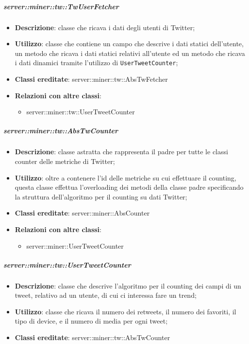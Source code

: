 	\subparagraph{server::miner::tw::TwUserFetcher} %
		\label{subp:server_miner_tw_TwUserFetcher}
			\begin{itemize}
				\item \textbf{Descrizione}: classe che ricava i dati degli utenti di Twitter;
				\item \textbf{Utilizzo}: classe che contiene un campo che descrive i dati statici dell'utente, un metodo che ricava i dati statici relativi all'utente ed un metodo che ricava i dati dinamici tramite l'utilizzo di \texttt{UserTweetCounter};
				\item \textbf{Classi ereditate}: server::miner::tw::AbsTwFetcher
				\item \textbf{Relazioni con altre classi}:
					\begin{itemize}
						\item server::miner::tw::UserTweetCounter
					\end{itemize}
			\end{itemize}

	\subparagraph{server::miner::tw::AbsTwCounter} %
		\label{subp:server_miner_tw_AbsTwCounter}
			\begin{itemize}
				\item \textbf{Descrizione}: classe astratta che rappresenta il padre per tutte le classi counter delle metriche di Twitter;
				\item \textbf{Utilizzo}: oltre a contenere l’id delle metriche su cui effettuare il counting, questa classe effettua l'overloading dei metodi della classe padre specificando la struttura dell'algoritmo per il counting su dati Twitter;
				\item \textbf{Classi ereditate}: server::miner::AbsCounter
				\item \textbf{Relazioni con altre classi}:
					\begin{itemize}
						\item server::miner::UserTweetCounter
					\end{itemize}
			\end{itemize}

	\subparagraph{server::miner::tw::UserTweetCounter} %
		\label{subp:server_miner_tw_UserTweetCounter}
			\begin{itemize}
				\item \textbf{Descrizione}: classe che descrive l'algoritmo per il counting dei campi di un tweet, relativo ad un utente, di cui ci interessa fare un trend;
				\item \textbf{Utilizzo}: classe che ricava il numero dei retweets, il numero dei favoriti, il tipo di device, e il numero di media per ogni tweet;
				\item \textbf{Classi ereditate}: server::miner::tw::AbsTwCounter
			\end{itemize}


